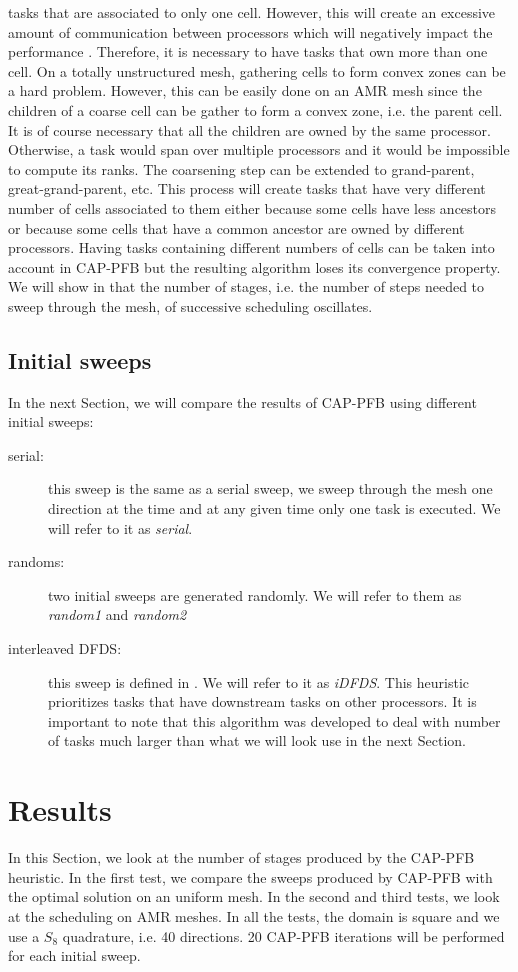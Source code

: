 \documentclass[letterpaper]{article}
\renewcommand{\(}{\left(}
\renewcommand{\)}{\right)}
\renewcommand{\[}{\left[}
\renewcommand{\]}{\right]}
\begin{document}
tasks that are associated to only one cell. However, this will create an
excessive amount of communication between processors which will negatively impact the performance
\cite{Pautz2002}. Therefore, it is necessary to have tasks that own more than
one cell. On a totally unstructured mesh, gathering cells to form convex zones
can be a hard problem. However, this can be easily done on an AMR mesh since the
children of a coarse cell can be gather to form a convex zone, i.e. the parent
cell. It is of course necessary that all the children are owned by the same
processor. Otherwise, a task would span over multiple processors and
it would be impossible to compute its ranks. The coarsening step 
can be extended to grand-parent, great-grand-parent, etc. This process will create
tasks that have very different number of cells associated to them either
because some cells have less ancestors or because some cells that have a common
ancestor are owned by different processors. Having tasks containing different
numbers of cells can be taken into account in CAP-PFB but the resulting
algorithm loses its convergence property. We will show in  that
the number of stages, i.e. the number of steps needed to sweep through the mesh,
of successive scheduling oscillates.

\subsection{Initial sweeps}
In the next Section, we will compare the results of CAP-PFB using different initial sweeps:
\begin{description}
  \item[serial:] this sweep is the same as a serial sweep, we sweep through the
    mesh one
    direction at the time and at any given time only one task is executed. We
    will refer to it as \emph{serial}.
  \item[randoms:] two initial sweeps are generated randomly. We will refer to
    them as \emph{random1} and \emph{random2}
  \item[interleaved DFDS:] this sweep is defined in \cite{Pautz2002}. We will
    refer to it as \emph{iDFDS}. This heuristic prioritizes tasks that have
    downstream tasks on other processors. It is important to note that this algorithm was
    developed to deal with number of tasks much larger than what we will look
    use in the next Section.
\end{description}

\section{Results} \label{results}
In this Section, we look at the number of stages produced by the CAP-PFB
heuristic. In the first test, we compare the sweeps produced by CAP-PFB
with the optimal solution on an uniform mesh. In the second and third tests, we
look at the scheduling on AMR meshes. In all the tests, the domain is square and
we use a $S_8$ quadrature, i.e. 40 directions. 20 CAP-PFB iterations will be
performed for each initial sweep.
\end{document}
